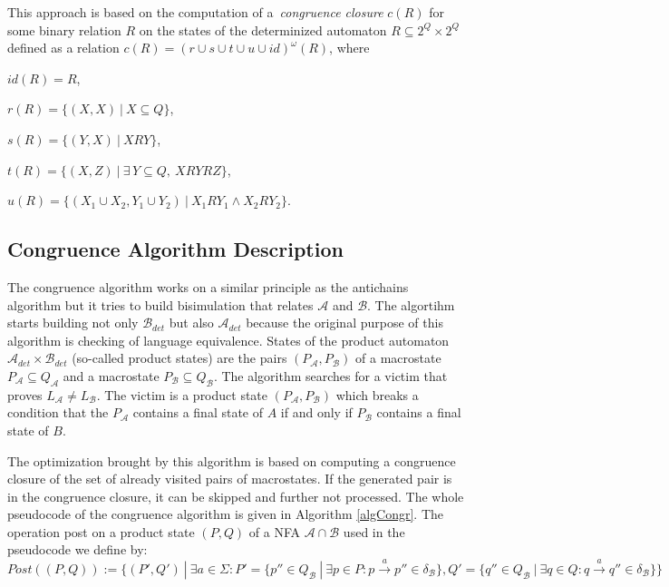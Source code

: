   This approach is based on the computation of a~\emph{congruence closure} $c(R)$ 
  for some binary relation $R$ on the states of the determinized automaton $R \subseteq 2^Q\times 2^Q$ defined 
  as a relation $c(R)=(r\cup s\cup t \cup u\cup id)^{\omega}(R)$, where
  \begin{description}
  \item $id(R)=R$, 
  \item $r(R)=\{(X,X)\ |\ X\subseteq Q\}$, 
  \item $s(R)=\{(Y,X)\ |\ XRY\}$,
  \item $t(R)=\{(X,Z)\ |\ \exists\,Y\subseteq Q,\ XRYRZ\}$,
  \item $u(R)=\{(X_1 \cup X_2,Y_1\cup Y_2)\ |\ X_1 R Y_1 \wedge X_2 R Y_2\}$. 
  \end{description}



 \subsection{Congruence Algorithm Description}
\label{subsectCongr}
The congruence algorithm works on a similar principle as the antichains algorithm but  
it tries to build bisimulation that relates $\mathcal{A}$ and $\mathcal{B}$. The algortihm starts building not only $\mathcal{B}_{det}$ 
but also $\mathcal{A}_{det}$ because the original purpose of this algorithm is checking of 
language equivalence. States of the product automaton $\mathcal{A}_{det} \times \mathcal{B}_{det}$  (so-called product states) are the pairs 
$(P_\mathcal{A},P_\mathcal{B})$ of a macrostate $P_\mathcal{A} \subseteq Q_\mathcal{A}$ and a macrostate
$P_\mathcal{B} \subseteq Q_\mathcal{B}$. 
The algorithm searches for a victim that proves $L_\mathcal{A} \neq L_\mathcal{B}$. The victim is a product state $(P_\mathcal{A},P_\mathcal{B})$ 
which breaks a condition that
the $P_\mathcal{A}$ contains a final state of $A$ if and only if $P_\mathcal{B}$ contains a final state of $B$. 

The optimization brought by this algorithm is based on computing a congruence closure of the set of already visited pairs of macrostates. 
If the generated pair is in the congruence closure, it can be skipped and further not processed.
The whole pseudocode of the congruence algorithm is given in Algorithm \ref{algCongr}. The operation post on a product state $(P,Q)$ of a 
NFA $\mathcal{A}\cap \mathcal{B}$ used in the pseudocode we define by:\
$Post((P,Q)):=\{(P',Q')\ |\ \exists a \in \Sigma: P'=
\{p''\in Q_\mathcal{B}\ |\ \exists p \in P:p\xrightarrow{a} p''\in \delta_\mathcal{B}\}, Q'=
\{q''\in Q_\mathcal{B}\ |\ \exists q \in Q:q\xrightarrow{a} q''\in \delta_\mathcal{B}\}\}$


